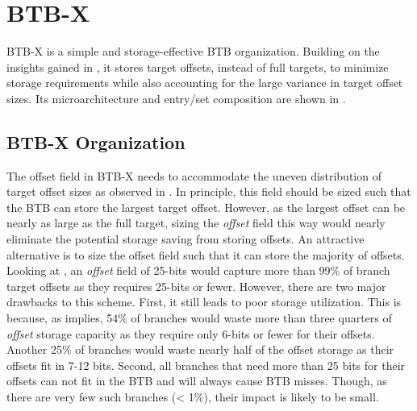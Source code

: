 \section{BTB-X}
\label{sec:design}

BTB-X is a simple and storage-effective BTB organization. Building on the insights gained in , it stores target offsets, instead of full targets, to minimize storage requirements while also accounting for the large variance in target offset sizes. Its microarchitecture and entry/set composition are shown in .

\subsection{BTB-X Organization}

The offset field in BTB-X needs to accommodate the uneven distribution of target offset sizes as observed in . In principle, this field should be sized such that the BTB can store the largest target offset. However, as the largest offset can be nearly as large as the full target, sizing the \textit{offset} field this way would nearly eliminate the potential storage saving from storing offsets. An attractive alternative is to size the offset field such that it can store the majority of offsets. Looking at , an \textit{offset} field of 25-bits would capture more than 99\% of branch target offsets as they requires 25-bits or fewer. However, there are two major drawbacks to this scheme. First, it still leads to poor storage utilization. This is because, as  implies, 54\% of branches would waste more than three quarters of \textit{offset} storage capacity as they require only 6-bits or fewer for their offsets. Another 25\% of branches would waste nearly half of the offset storage as their offsets fit in 7-12 bits. Second, all branches that need more than 25 bits for their offsets can not fit in the BTB and will always cause BTB misses. Though, as there are very few such branches (< 1\%), their impact is likely to be small.

